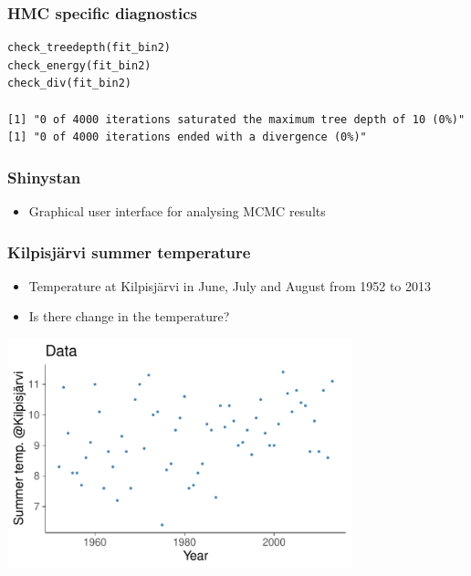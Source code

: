 \documentclass[10pt,handout]{beamer}
\begin{document}
\begin{frame}[fragile]

\frametitle{HMC specific diagnostics}

  {\scriptsize
\begin{lstlisting}
check_treedepth(fit_bin2)
check_energy(fit_bin2)
check_div(fit_bin2)

[1] "0 of 4000 iterations saturated the maximum tree depth of 10 (0%)"
[1] "0 of 4000 iterations ended with a divergence (0%)"
\end{lstlisting}
  }

\end{frame}

\begin{frame}[fragile]

\frametitle{Shinystan}

  \begin{itemize}
  \item Graphical user interface for analysing MCMC results
  \end{itemize}

\end{frame}

\begin{frame}

\frametitle{Kilpisjärvi summer temperature}

  \begin{itemize}
  \item Temperature at Kilpisjärvi in June, July and August from 1952 to 2013
  \item Is there change in the temperature?
  \end{itemize}
  \begin{center}
    \includegraphics[width=10cm]{figs/kilpis_data.pdf}
  \end{center}

\end{frame}
\end{document}
